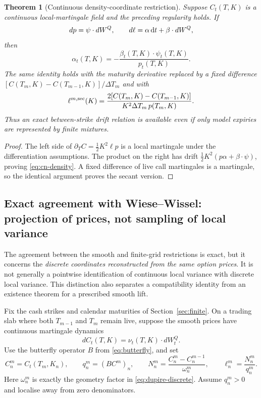 \documentclass[11pt,a4paper]{article}
\numberwithin{equation}{section}
\newtheorem{theorem}{Theorem}[section]
\theoremstyle{definition}\newtheorem{definition}[theorem]{Definition}
\theoremstyle{remark}\newtheorem{remark}[theorem]{Remark}
\begin{document}
\begin{theorem}[Continuous density-coordinate restriction]
\label{thm:continuous}
Suppose $C_t(T,K)$ is a continuous local-martingale field and the preceding regularity holds. If
\[
 dp=\psi\cdot dW^Q,\qquad d\ell=\alpha\,\mathrm dt+\beta\cdot dW^Q,
\]
then
\begin{equation}
 \boxed{\quad\alpha_t(T,K)=-\frac{\beta_t(T,K)\cdot\psi_t(T,K)}{p_t(T,K)}.\quad}
 \label{eq:cn-density}
\end{equation}
The same identity holds with the maturity derivative replaced by a fixed difference $[C(T_m,K)-C(T_{m-1},K)]/\Delta T_m$ and with
\begin{equation}
 \ell^{m,\rm sec}(K)=\frac{2[C(T_m,K)-C(T_{m-1},K)]}{K^2\Delta T_m\,p(T_m,K)}.
 \label{eq:secant}
\end{equation}
Thus an exact between-strike drift relation is available even if only model expiries are represented by finite mixtures.
\end{theorem}
\begin{proof}
The left side of $\partial_TC=\tfrac12K^2\ell p$ is a local martingale under the differentiation assumptions. The product on the right has drift $\tfrac12K^2(p\alpha+\beta\cdot\psi)$, proving \eqref{eq:cn-density}. A fixed difference of live call martingales is a martingale, so the identical argument proves the secant version.
\end{proof}
\subsection{Exact agreement with Wiese--Wissel: projection of prices, not sampling of local variance}
\label{sec:ww-smooth-agreement}
The agreement between the smooth and finite-grid restrictions is exact, but it concerns the \emph{discrete coordinates reconstructed from the same option prices}. It is not generally a pointwise identification of continuous local variance with discrete local variance. This distinction also separates a compatibility identity from an existence theorem for a prescribed smooth lift.

Fix the cash strikes and calendar maturities of Section~\ref{sec:finite}. On a trading slab where both $T_{m-1}$ and $T_m$ remain live, suppose the smooth prices have continuous martingale dynamics
\[
 dC_t(T,K)=\nu_t(T,K)\cdot dW_t^Q.
\]
Use the butterfly operator $B$ from \eqref{eq:butterfly}, and set
\[
 C_n^m=C_t(T_m,K_n),\qquad
 q_n^m=(BC^m)_n,\qquad
 N_n^m=\frac{C_n^m-C_n^{m-1}}{\omega_n^m},\qquad
 \ell_n^m=\frac{N_n^m}{q_n^m}.
\]
Here $\omega_n^m$ is exactly the geometry factor in \eqref{eq:dupire-discrete}. Assume $q_n^m>0$ and localise away from zero denominators.
\end{document}
